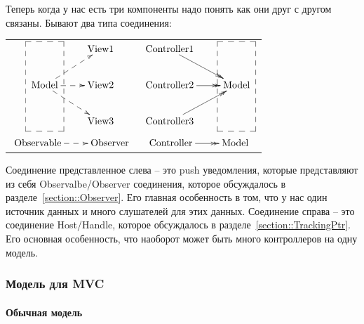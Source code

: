 Теперь когда у нас есть три компоненты надо понять как они друг с другом связаны.
Бывают два типа соединения:
\begin{center}
\begin{tabular}{cc}
{
$
\xymatrix{
  {\phantom{\text{Model}}}
  {\save
  [].[dd]*+[F--]\frm{}
  \restore
  } 
  &{\text{View1}}\\
  {\text{Model}}\ar@{-->}[ru]\ar@{-->}[r]\ar@{-->}[rd]&{\text{View2}}\\
  {}&{\text{View3}}\\
}
$
}
&
{
$
\xymatrix{
  {\text{Controller1}}\ar@{->>}[rd]&  {\phantom{\text{Model}}}
  {\save
  [].[dd]*+[F--]\frm{}
  \restore
  }
  \\
  {\text{Controller2}}\ar@{->>}[r]&{\text{Model}}\\
  {\text{Controller3}}\ar@{->>}[ru]&{}\\
}
$
}\vspace{0.5cm}\\
{
$
\xymatrix{
  {\text{Observable}}\ar@{-->}[r]&{\text{Observer}}
}
$
}
&
{
$
\xymatrix{
  {\text{Controller}}\ar@{->>}[r]&{\text{Model}}
}
$
}
\end{tabular}
\end{center}
Соединение представленное слева -- это push уведомления, которые представляют из себя Observalbe/Observer соединения, которое обсуждалось в разделе~\ref{section::Observer}.
Его главная особенность в том, что у нас один источник данных и много слушателей для этих данных.
Соединение справа -- это соединение Host/Handle, которое обсуждалось в разделе~\ref{section::TrackingPtr}.
Его основная особенность, что наоборот может быть много контроллеров на одну модель.

\subsubsection{Модель для MVC}

\paragraph{Обычная модель}

